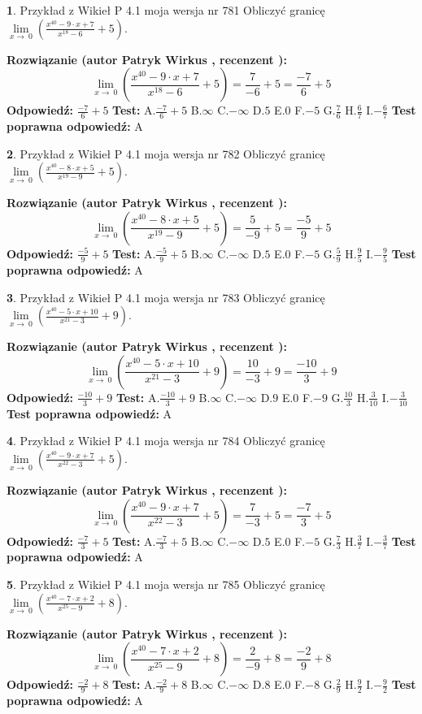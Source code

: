 \documentclass[12pt, a4paper]{article}
\theoremstyle{definition} %
\newtheorem{zad}{}
\newcommand{\zadStart}[1]{\begin{zad}#1\newline}
\newcommand{\zadStop}{\end{zad}}
\newcommand{\rozwStart}[2]{\noindent \textbf{Rozwiązanie (autor #1 , recenzent #2): }\newline}
\newcommand{\rozwStop}{\newline}
\newcommand{\odpStart}{\noindent \textbf{Odpowiedź:}\newline}
\newcommand{\odpStop}{\newline}
\newcommand{\testStart}{\noindent \textbf{Test:}\newline}
\newcommand{\testStop}{\newline}
\newcommand{\kluczStart}{\noindent \textbf{Test poprawna odpowiedź:}\newline}
\newcommand{\kluczStop}{\newline}
\begin{document}
\zadStart{Przykład z Wikieł P 4.1 moja wersja nr 781}
Obliczyć granicę $\lim\limits_{x\to\ 0}(\frac{x^{40}-9 \cdot x +7}{x^{18}-6}+5)$.
\zadStop
\rozwStart{Patryk Wirkus}{}
$$\lim\limits_{x\to\ 0}(\frac{x^{40}-9 \cdot x +7}{x^{18}-6}+5)=\frac{7}{-6}+5=\frac{-7}{6}+5$$
\rozwStop
\odpStart
$\frac{-7}{6}+5$
\odpStop
\testStart
A.$\frac{-7}{6}+5$
B.$\infty$
C.$-\infty$
D.$5$
E.$0$
F.$-5$
G.$\frac{7}{6}$
H.$\frac{6}{7}$
I.$-\frac{6}{7}$
\testStop
\kluczStart
A
\kluczStop



\zadStart{Przykład z Wikieł P 4.1 moja wersja nr 782}
Obliczyć granicę $\lim\limits_{x\to\ 0}(\frac{x^{40}-8 \cdot x +5}{x^{19}-9}+5)$.
\zadStop
\rozwStart{Patryk Wirkus}{}
$$\lim\limits_{x\to\ 0}(\frac{x^{40}-8 \cdot x +5}{x^{19}-9}+5)=\frac{5}{-9}+5=\frac{-5}{9}+5$$
\rozwStop
\odpStart
$\frac{-5}{9}+5$
\odpStop
\testStart
A.$\frac{-5}{9}+5$
B.$\infty$
C.$-\infty$
D.$5$
E.$0$
F.$-5$
G.$\frac{5}{9}$
H.$\frac{9}{5}$
I.$-\frac{9}{5}$
\testStop
\kluczStart
A
\kluczStop



\zadStart{Przykład z Wikieł P 4.1 moja wersja nr 783}
Obliczyć granicę $\lim\limits_{x\to\ 0}(\frac{x^{40}-5 \cdot x +10}{x^{21}-3}+9)$.
\zadStop
\rozwStart{Patryk Wirkus}{}
$$\lim\limits_{x\to\ 0}(\frac{x^{40}-5 \cdot x +10}{x^{21}-3}+9)=\frac{10}{-3}+9=\frac{-10}{3}+9$$
\rozwStop
\odpStart
$\frac{-10}{3}+9$
\odpStop
\testStart
A.$\frac{-10}{3}+9$
B.$\infty$
C.$-\infty$
D.$9$
E.$0$
F.$-9$
G.$\frac{10}{3}$
H.$\frac{3}{10}$
I.$-\frac{3}{10}$
\testStop
\kluczStart
A
\kluczStop



\zadStart{Przykład z Wikieł P 4.1 moja wersja nr 784}
Obliczyć granicę $\lim\limits_{x\to\ 0}(\frac{x^{40}-9 \cdot x +7}{x^{22}-3}+5)$.
\zadStop
\rozwStart{Patryk Wirkus}{}
$$\lim\limits_{x\to\ 0}(\frac{x^{40}-9 \cdot x +7}{x^{22}-3}+5)=\frac{7}{-3}+5=\frac{-7}{3}+5$$
\rozwStop
\odpStart
$\frac{-7}{3}+5$
\odpStop
\testStart
A.$\frac{-7}{3}+5$
B.$\infty$
C.$-\infty$
D.$5$
E.$0$
F.$-5$
G.$\frac{7}{3}$
H.$\frac{3}{7}$
I.$-\frac{3}{7}$
\testStop
\kluczStart
A
\kluczStop



\zadStart{Przykład z Wikieł P 4.1 moja wersja nr 785}
Obliczyć granicę $\lim\limits_{x\to\ 0}(\frac{x^{40}-7 \cdot x +2}{x^{25}-9}+8)$.
\zadStop
\rozwStart{Patryk Wirkus}{}
$$\lim\limits_{x\to\ 0}(\frac{x^{40}-7 \cdot x +2}{x^{25}-9}+8)=\frac{2}{-9}+8=\frac{-2}{9}+8$$
\rozwStop
\odpStart
$\frac{-2}{9}+8$
\odpStop
\testStart
A.$\frac{-2}{9}+8$
B.$\infty$
C.$-\infty$
D.$8$
E.$0$
F.$-8$
G.$\frac{2}{9}$
H.$\frac{9}{2}$
I.$-\frac{9}{2}$
\testStop
\kluczStart
A
\kluczStop
\end{document}
